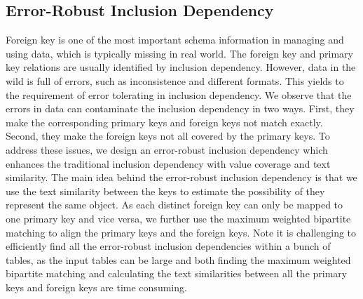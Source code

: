 






\subsection{Error-Robust Inclusion Dependency}\label{subsec:eind}




Foreign key is one of the most important schema information in managing and using data, which is typically missing in real world. The foreign key and primary key relations are usually identified by inclusion dependency. However, data in the wild is full of errors, such as inconsistence and different formats. This yields to the requirement of error tolerating in inclusion dependency. We observe that the errors in data can contaminate the inclusion dependency in two ways. First, they make the corresponding primary keys and foreign keys not match exactly. Second, they make the foreign keys not all covered by the primary keys. To address these issues, we design an error-robust inclusion dependency which enhances the traditional inclusion dependency with value coverage and text similarity. The main idea behind the error-robust inclusion dependency is that we use the text similarity between the keys to estimate the possibility of they represent the same object. As each distinct foreign key can only be mapped to one primary key and vice versa, we further use the maximum weighted bipartite matching to align the primary keys and the foreign keys. Note it is challenging to efficiently find all the error-robust inclusion dependencies within a bunch of tables, as the input tables can be large and both finding the maximum weighted bipartite matching and calculating the text similarities between all the primary keys and foreign keys are time consuming.



